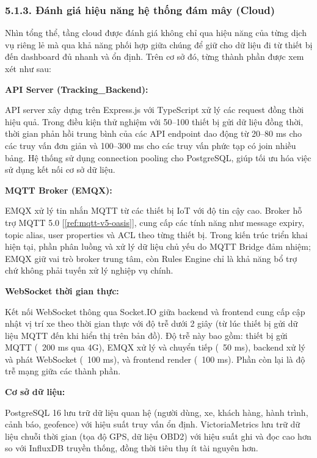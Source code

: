 \documentclass[a4paper]{extarticle}
\newcommand{\ieeecite}[1]{[\ref{#1}]}
\providecommand{\parencite}[1]{\ieeecite{#1}}
\begin{document}
\subsubsection{5.1.3. Đánh giá hiệu năng hệ thống đám mây
(Cloud)}\label{513-ux111uxe1nh-giuxe1-hiux1ec7u-nux103ng-hux1ec7-thux1ed1ng-ux111uxe1m-muxe2y-cloud}

Nhìn tổng thể, tầng cloud được đánh giá không chỉ qua hiệu năng của từng
dịch vụ riêng lẻ mà qua khả năng phối hợp giữa chúng để giữ cho dữ liệu
đi từ thiết bị đến dashboard đủ nhanh và ổn định. Trên cơ sở đó, từng
thành phần được xem xét như sau:

\textbf{API Server (Tracking\_Backend):}

API server xây dựng trên Express.js với TypeScript xử lý các request
đồng thời hiệu quả. Trong điều kiện thử nghiệm với 50--100 thiết bị gửi
dữ liệu đồng thời, thời gian phản hồi trung bình của các API endpoint
dao động từ 20--80 ms cho các truy vấn đơn giản và 100--300 ms cho các
truy vấn phức tạp có join nhiều bảng. Hệ thống sử dụng connection
pooling cho PostgreSQL, giúp tối ưu hóa việc sử dụng kết nối cơ sở dữ
liệu.

\textbf{MQTT Broker (EMQX):}

EMQX xử lý tin nhắn MQTT từ các thiết bị IoT với độ tin cậy cao. Broker
hỗ trợ MQTT 5.0 \parencite{ref:mqtt-v5-oasis}, cung cấp các tính năng như message expiry, topic alias,
user properties và ACL theo từng thiết bị. Trong kiến trúc triển khai
hiện tại, phần phân luồng và xử lý dữ liệu chủ yếu do MQTT Bridge đảm
nhiệm; EMQX giữ vai trò broker trung tâm, còn Rules Engine chỉ là khả
năng bổ trợ chứ không phải tuyến xử lý nghiệp vụ chính.

\textbf{WebSocket thời gian thực:}

Kết nối WebSocket thông qua Socket.IO giữa backend và frontend cung cấp
cập nhật vị trí xe theo thời gian thực với độ trễ dưới 2 giây (từ lúc
thiết bị gửi dữ liệu MQTT đến khi hiển thị trên bản đồ). Độ trễ này bao
gồm: thiết bị gửi MQTT (~200 ms qua 4G), EMQX xử lý và
chuyển tiếp (~50 ms), backend xử lý và phát WebSocket
(~100 ms), và frontend render (~100 ms).
Phần còn lại là độ trễ mạng giữa các thành phần.

\textbf{Cơ sở dữ liệu:}

PostgreSQL 16 lưu trữ dữ liệu quan hệ (người dùng, xe, khách hàng, hành
trình, cảnh báo, geofence) với hiệu suất truy vấn ổn định.
VictoriaMetrics lưu trữ dữ liệu chuỗi thời gian (tọa độ GPS, dữ liệu
OBD2) với hiệu suất ghi và đọc cao hơn so với InfluxDB truyền thống,
đồng thời tiêu thụ ít tài nguyên hơn.
\end{document}
